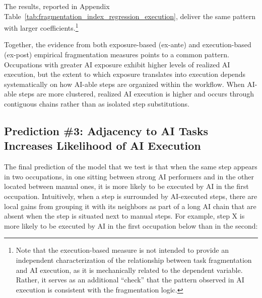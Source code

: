 The results, reported in Appendix Table~\ref{tab:fragmentation_index_regression_execution}, deliver the same pattern with larger coefficients.\footnote{Note that the execution-based measure is not intended to provide an independent characterization of the relationship between task fragmentation and AI execution, as it is mechanically related to the dependent variable. Rather, it serves as an additional ``check'' that the pattern observed in AI execution is consistent with the fragmentation logic.}

Together, the evidence from both exposure-based (ex-ante) and execution-based (ex-post) empirical fragmentation measures points to a common pattern.
Occupations with greater AI exposure exhibit higher levels of realized AI execution, but the extent to which exposure translates into execution depends systematically on how AI-able steps are organized within the workflow.
When AI-able steps are more clustered, realized AI execution is higher and occurs through contiguous chains rather than as isolated step substitutions.




\subsection{Prediction \#3: Adjacency to AI Tasks Increases Likelihood of AI Execution}
\label{sec:DWA_prediction}

The final prediction of the model that we test is that when the same step appears in two occupations, in one sitting between strong AI performers and in the other located between manual ones, it is more likely to be executed by AI in the first occupation.
Intuitively, when a step is surrounded by AI-executed steps, there are local gains from grouping it with its neighbors as part of a long AI chain that are absent when the step is situated next to manual steps.
For example, step X is more likely to be executed by AI in the first occupation below than in the second: \\




